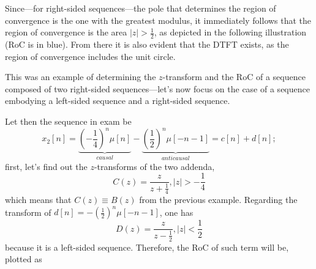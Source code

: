 \documentclass[\documentfontsize, twocolumn]{\classname}
\begin{document}
Since---for right-sided sequences---the pole that de\-ter\-mi\-nes the region of convergence is the one with the greatest modulus, it immediately follows that the region of convergence is the area $|z| > \frac 1 2$, as depicted in the following illustration (RoC is in blue). From there it is also evident that the DTFT exists, as the region of convergence includes the unit circle.

This was an example of determining the $z$-transform and the RoC of a sequence composed of two right-sided sequences---let's now focus on the case of a sequence embodying a left-sided sequence and a right-sided sequence.

\begin{center}
\end{center}

Let then the sequence in exam be
\[
    x_2[n] = \underbrace{\left(-\frac 1 4\right)^n \mu[n]}_{causal} - \underbrace{\left(\frac 1 2\right)^n \mu[-n-1]}_{anticausal} = c[n] + d[n];
\]
first, let's find out the $z$-transforms of the two addenda,
\[
    C(z) = \frac{z}{z + \frac 1 4}, |z| > - \frac 1 4
\]
which means that $C(z) \equiv B(z)$ from the previous example. Regarding the transform of $d[n] = - (\frac 1 2)^n \mu[-n-1]$, one has
\[
    D(z) = \frac{z}{z-\frac 1 2}, |z| < \frac 1 2
\]
because it is a left-sided sequence. Therefore, the RoC of such term will be, plotted as
\begin{center}
\end{center}
\end{document}
